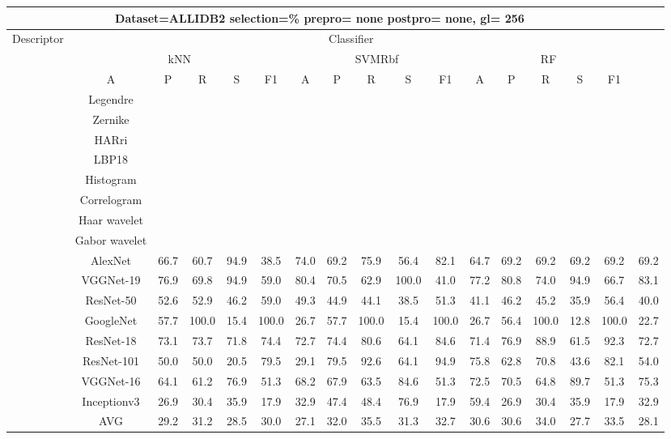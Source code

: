 \documentclass[12pt,italian]{article}
\begin{document}
\begin{tiny}
 \pagebreak 
\begin{longtable}{lcccccccccccccccc}
\toprule
\multicolumn{16}{c}{Dataset=ALLIDB2 selection=\% prepro= none postpro= none, gl= 256} \\ 
\toprule
Descriptor & \multicolumn{15}{c}{Classifier} \\ 
& \multicolumn{5}{c}{kNN} & \multicolumn{5}{c}{SVMRbf} & \multicolumn{5}{c}{RF} \\ 
& A & P & R & S & F1 & A & P & R & S & F1 & A & P & R & S & F1 \\ 
\midrule
& Legendre \\ 
& Zernike \\ 
& HARri \\ 
& LBP18 \\ 
& Histogram \\ 
& Correlogram \\ 
& Haar wavelet \\ 
& Gabor wavelet \\ 
& AlexNet & 66.7 & 60.7 & 94.9 & 38.5 & 74.0 & 69.2 & 75.9 & 56.4 & 82.1 & 64.7 & 69.2 & 69.2 & 69.2 & 69.2 & 69.2 \\ 
& VGGNet-19 & 76.9 & 69.8 & 94.9 & 59.0 & 80.4 & 70.5 & 62.9 & 100.0 & 41.0 & 77.2 & 80.8 & 74.0 & 94.9 & 66.7 & 83.1 \\ 
& ResNet-50 & 52.6 & 52.9 & 46.2 & 59.0 & 49.3 & 44.9 & 44.1 & 38.5 & 51.3 & 41.1 & 46.2 & 45.2 & 35.9 & 56.4 & 40.0 \\ 
& GoogleNet & 57.7 & 100.0 & 15.4 & 100.0 & 26.7 & 57.7 & 100.0 & 15.4 & 100.0 & 26.7 & 56.4 & 100.0 & 12.8 & 100.0 & 22.7 \\ 
& ResNet-18 & 73.1 & 73.7 & 71.8 & 74.4 & 72.7 & 74.4 & 80.6 & 64.1 & 84.6 & 71.4 & 76.9 & 88.9 & 61.5 & 92.3 & 72.7 \\ 
& ResNet-101 & 50.0 & 50.0 & 20.5 & 79.5 & 29.1 & 79.5 & 92.6 & 64.1 & 94.9 & 75.8 & 62.8 & 70.8 & 43.6 & 82.1 & 54.0 \\ 
& VGGNet-16 & 64.1 & 61.2 & 76.9 & 51.3 & 68.2 & 67.9 & 63.5 & 84.6 & 51.3 & 72.5 & 70.5 & 64.8 & 89.7 & 51.3 & 75.3 \\ 
& Inceptionv3 & 26.9 & 30.4 & 35.9 & 17.9 & 32.9 & 47.4 & 48.4 & 76.9 & 17.9 & 59.4 & 26.9 & 30.4 & 35.9 & 17.9 & 32.9 \\ 
\hline
& AVG & 29.2 & 31.2 & 28.5 & 30.0 & 27.1 & 32.0 & 35.5 & 31.3 & 32.7 & 30.6 & 30.6 & 34.0 & 27.7 & 33.5 & 28.1 \\ 
\hline
\bottomrule
\end{longtable} 

 \pagebreak 
\end{tiny} 
 
\end{document}
